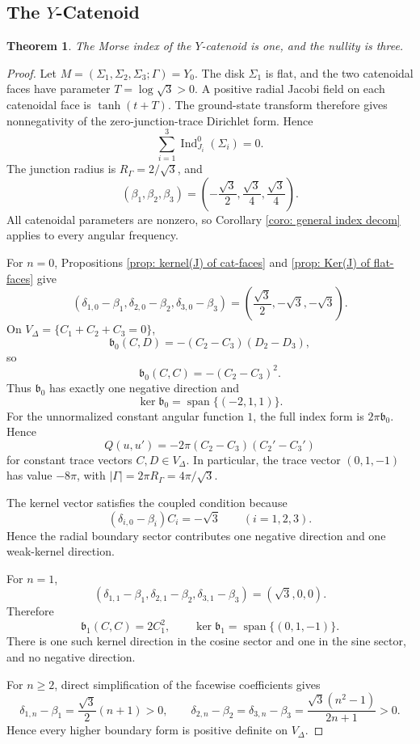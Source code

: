 \documentclass[11pt,twoside]{amsart}
\newtheorem{thm}{Theorem}[section]
\numberwithin{equation}{section}
\begin{document}
\subsection{The \texorpdfstring{$Y$}{Y}-Catenoid}
\begin{thm}
The Morse index of the $Y$-catenoid is one, and the nullity is three.
\end{thm}
\begin{proof}
Let $M=(\Sigma_1,\Sigma_2,\Sigma_3;\Gamma)=Y_0$. The disk $\Sigma_1$ is flat, and the two catenoidal faces have parameter $T=\log\sqrt3>0$. A positive radial Jacobi field on each catenoidal face is $\tanh(t+T)$. The ground-state transform therefore gives nonnegativity of the zero-junction-trace Dirichlet form. Hence
\[
\sum_{i=1}^3\operatorname{Ind}_{J_i}^0(\Sigma_i)=0.
\]
The junction radius is $R_\Gamma=2/\sqrt3$, and
\[
(\beta_1,\beta_2,\beta_3)
=\left(-\frac{\sqrt3}{2},\frac{\sqrt3}{4},\frac{\sqrt3}{4}\right).
\]
All catenoidal parameters are nonzero, so Corollary \ref{coro: general index decom} applies to every angular frequency.

For $n=0$, Propositions \ref{prop: kernel(J) of cat-faces} and \ref{prop: Ker(J) of flat-faces} give
\[
(\delta_{1,0}-\beta_1,\delta_{2,0}-\beta_2,\delta_{3,0}-\beta_3)
=\left(\frac{\sqrt3}{2},-\sqrt3,-\sqrt3\right).
\]
On $V_\Delta=\{C_1+C_2+C_3=0\}$,
\[
\mathfrak b_0(C,D)=-(C_2-C_3)(D_2-D_3),
\]
so
\[
\mathfrak b_0(C,C)=-(C_2-C_3)^2.
\]
Thus $\mathfrak b_0$ has exactly one negative direction and
\[
\ker\mathfrak b_0=\operatorname{span}\{(-2,1,1)\}.
\]
For the unnormalized constant angular function $1$, the full index form is $2\pi\mathfrak b_0$. Hence
\[
Q(u,u')=-2\pi(C_2-C_3)(C_2'-C_3')
\]
for constant trace vectors $C,D\in V_\Delta$. In particular, the trace vector $(0,1,-1)$ has value $-8\pi$, with $|\Gamma|=2\pi R_\Gamma=4\pi/\sqrt3$.

The kernel vector satisfies the coupled condition because
\[
(\delta_{i,0}-\beta_i)C_i=-\sqrt3
\qquad(i=1,2,3).
\]
Hence the radial boundary sector contributes one negative direction and one weak-kernel direction.

For $n=1$,
\[
(\delta_{1,1}-\beta_1,\delta_{2,1}-\beta_2,\delta_{3,1}-\beta_3)=(\sqrt3,0,0).
\]
Therefore
\[
\mathfrak b_1(C,C)=2C_1^2,
\qquad
\ker\mathfrak b_1=\operatorname{span}\{(0,1,-1)\}.
\]
There is one such kernel direction in the cosine sector and one in the sine sector, and no negative direction.

For $n\ge2$, direct simplification of the facewise coefficients gives
\[
\delta_{1,n}-\beta_1=\frac{\sqrt3}{2}(n+1)>0,
\qquad
\delta_{2,n}-\beta_2=\delta_{3,n}-\beta_3
=\frac{\sqrt3(n^2-1)}{2n+1}>0.
\]
Hence every higher boundary form is positive definite on $V_\Delta$.


\end{proof}
\end{document}
